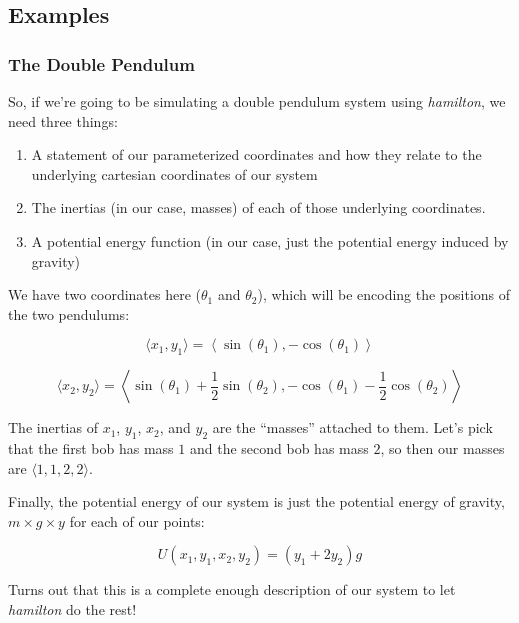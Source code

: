 \documentclass[]{article}
\begin{document}
\subsection{Examples}\label{examples}

\subsubsection{The Double Pendulum}\label{the-double-pendulum}

So, if we're going to be simulating a double pendulum system using
\emph{hamilton}, we need three things:

\begin{enumerate}
\def\labelenumi{\arabic{enumi}.}
\item
  A statement of our parameterized coordinates and how they relate to the
  underlying cartesian coordinates of our system
\item
  The inertias (in our case, masses) of each of those underlying coordinates.
\item
  A potential energy function (in our case, just the potential energy induced by
  gravity)
\end{enumerate}

We have two coordinates here (\(\theta_1\) and \(\theta_2\)), which will be
encoding the positions of the two pendulums:

\[
\langle x_1, y_1 \rangle =
  \left\langle \sin (\theta_1), - \cos (\theta_1) \right\rangle
\]

\[
\langle x_2, y_2 \rangle =
  \left\langle \sin (\theta_1) + \frac{1}{2} \sin (\theta_2),
    - \cos (\theta_1) - \frac{1}{2} \cos (\theta_2) \right\rangle
\]

The inertias of \(x_1\), \(y_1\), \(x_2\), and \(y_2\) are the ``masses''
attached to them. Let's pick that the first bob has mass \(1\) and the second
bob has mass \(2\), so then our masses are \(\langle 1, 1, 2, 2 \rangle\).

Finally, the potential energy of our system is just the potential energy of
gravity, \(m \times g \times y\) for each of our points:

\[
U(x_1, y_1, x_2, y_2) = ( y_1 + 2 y_2 ) g
\]

Turns out that this is a complete enough description of our system to let
\emph{hamilton} do the rest!
\end{document}
